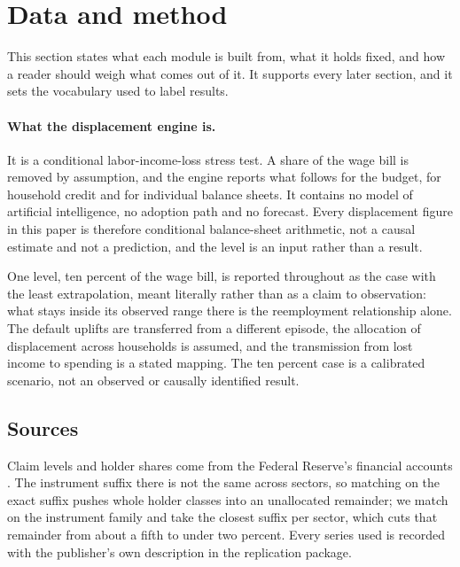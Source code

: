 \section{Data and method}
\label{sec:data}

This section states what each module is built from, what it holds fixed, and how a reader should
weigh what comes out of it. It supports every later section, and it sets the vocabulary used to
label results.

\paragraph{What the displacement engine is.} It is a conditional labor-income-loss stress test. A
share of the wage bill is removed by assumption, and the engine reports what follows for the
budget, for household credit and for individual balance sheets. It contains no model of
artificial intelligence, no adoption path and no forecast. Every displacement figure in this
paper is therefore conditional balance-sheet arithmetic, not a causal estimate and not a
prediction, and the level is an input rather than a result.

One level, ten percent of the wage bill, is reported throughout as the case with the least
extrapolation, meant literally rather than as a claim to observation: what stays inside its
observed range there is the reemployment relationship alone. The default uplifts are transferred
from a different episode, the allocation of displacement across households is assumed, and the
transmission from lost income to spending is a stated mapping. The ten percent case is a
calibrated scenario, not an observed or causally identified result.

\subsection{Sources}

Claim levels and holder shares come from the Federal Reserve's financial accounts
\citep{FRBZ1}. The instrument suffix there is not the same across sectors, so matching on the
exact suffix pushes whole holder classes into an unallocated remainder; we match on the instrument
family and take the closest suffix per sector, which cuts that remainder from about a fifth to
under two percent. Every series used is recorded with the publisher's own description in the
replication package.

